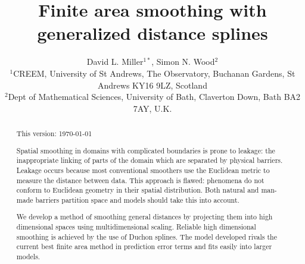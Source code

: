 \documentclass[useAMS, referee]{biom}
\title[Finite area smoothing with generalized distance splines]{Finite area smoothing with generalized distance splines}
\author{David L. Miller$^{1*}$\email{dave@ninepointeightone.net}, Simon N. Wood$^{2}$\\
$^{1}$CREEM, University of St Andrews, The Observatory, Buchanan Gardens, St Andrews KY16 9LZ, Scotland\\
$^{2}$Dept of Mathematical Sciences, University of Bath, Claverton Down, Bath BA2 7AY, U.K.
}
\begin{document}








\label{firstpage}


\begin{abstract}
This version: \today %

Spatial smoothing in domains with complicated boundaries is prone to leakage: the inappropriate linking of parts of the domain which are separated by physical barriers. Leakage occurs because most conventional smoothers use the Euclidean metric to measure the distance between data. This approach is flawed: phenomena do not conform to Euclidean geometry in their spatial distribution. Both natural and man-made barriers partition space and models should take this into account. 

We develop a method of smoothing general distances by projecting them into high dimensional spaces using multidimensional scaling. Reliable high dimensional smoothing is achieved by the use of Duchon splines. The model developed rivals the current best finite area method in prediction error terms and fits easily into larger models.
\end{abstract}
\end{document}
